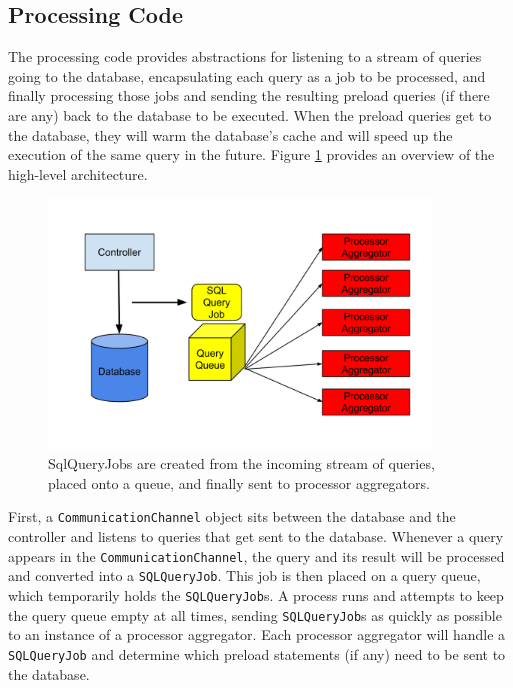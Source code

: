 \documentclass[12pt]{article}
\begin{document}
\subsection{Processing Code}

The processing code provides abstractions for listening to a stream of queries going to the database, encapsulating each query as a job to be processed, and finally processing those jobs and sending the resulting preload queries (if there are any) back to the database to be executed. When the preload queries get to the database, they will warm the database's cache and will speed up the execution of the same query in the future. Figure \ref{fig:system-overview} provides an overview of the high-level architecture.

\begin{figure}[h]
  \centering
  \includegraphics[width=4in]{figures/eager_db_overview.png}
  \caption{\label{fig:system-overview}SqlQueryJobs are created from the incoming stream of queries, placed onto a queue, and finally sent to processor aggregators.}
\end{figure}

First, a \texttt{CommunicationChannel} object sits between the database and the controller and listens to queries that get sent to the database. Whenever a query appears in the \texttt{CommunicationChannel}, the query and its result will be processed and converted into a \texttt{SQLQueryJob}. This job is then placed on a query queue, which temporarily holds the \texttt{SQLQueryJob}s. A process runs and attempts to keep the query queue empty at all times, sending \texttt{SQLQueryJob}s as quickly as possible to an instance of a processor aggregator. Each processor aggregator will handle a \texttt{SQLQueryJob} and determine which preload statements (if any) need to be sent to the database.
\end{document}
